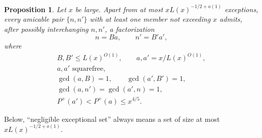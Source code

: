 \documentclass[11pt]{amsart}
\newtheorem{proposition}[lemma]{Proposition}
\begin{document}
    \begin{proposition}\label{prop:structural}
    Let $x$ be large. Apart from at most \(xL(x)^{-1/2+o(1)}\) exceptions, every amicable pair \(\{n,n'\}\) with at least one member not exceeding \(x\) admits, after possibly interchanging \(n,n'\), a factorization
    \[
     n=Ba,\qquad n'=B'a',
    \]
    where
    \[
    \begin{gathered}
     B,B'\le L(x)^{O(1)},\qquad a,a'=x/L(x)^{O(1)},\\
     a,a'\text{ squarefree},\\
     \gcd(a,B)=1,\qquad \gcd(a',B')=1,\\
     \gcd(a,n')=\gcd(a',n)=1,\\
     P^{+}(a')<P^{+}(a)\le x^{4/5}.
    \end{gathered}
    \]
    \end{proposition}
   Below, ``negligible exceptional set'' always means a set of size at most $xL(x)^{-1/2+o(1)}$.
    
\end{document}
